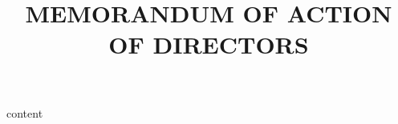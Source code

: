 \documentclass[12pt]{scrartcl}
\title{MEMORANDUM OF ACTION\\OF DIRECTORS}
\begin{document}
\maketitle
{content}
\end{document}
